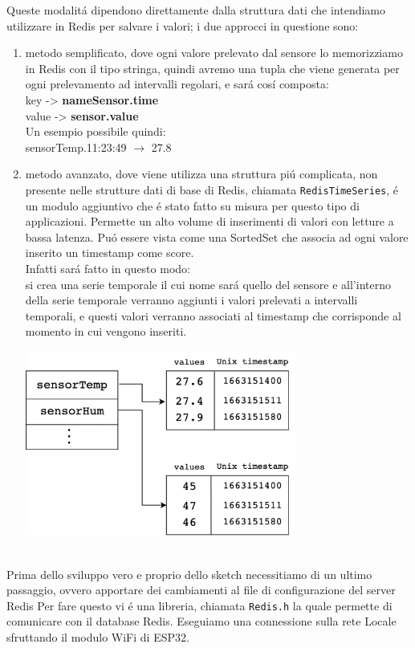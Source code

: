 Queste modalitá dipendono direttamente dalla struttura dati che intendiamo utilizzare in Redis per salvare i valori;
i due approcci in questione sono:
\begin{enumerate}
    \item metodo semplificato, dove ogni valore prelevato dal sensore lo memorizziamo in Redis con il tipo stringa,
    quindi avremo una tupla che viene generata per ogni prelevamento ad intervalli regolari, e sará cosí composta:\\
    key -> \textbf{nameSensor.time}\\
    value -> \textbf{sensor.value} \\
    Un esempio possibile quindi:\\
    sensorTemp.11:23:49 $\to$ 27.8
    \item metodo avanzato, dove viene utilizza una struttura piú complicata, non presente nelle strutture dati di base di Redis,
    chiamata \texttt{RedisTimeSeries}, é un modulo aggiuntivo che é stato fatto su misura per questo tipo di applicazioni.
    Permette un alto volume di inserimenti di valori con letture a bassa latenza. Puó essere vista come una SortedSet che associa
    ad ogni valore inserito un timestamp come score.\\
    Infatti sará fatto in questo modo:\\
    si crea una serie temporale il cui nome sará quello del sensore e all'interno della serie temporale verranno aggiunti i valori
    prelevati a intervalli temporali, e questi valori verranno associati al timestamp che corrisponde
    al momento in cui vengono inseriti.

    \includegraphics[width=0.7\textwidth]{img/redistimeseries}
\end{enumerate}

\\

Prima dello sviluppo vero e proprio dello sketch necessitiamo di un ultimo passaggio, ovvero apportare dei cambiamenti al file di configurazione del server Redis
Per fare questo vi é una libreria, chiamata \texttt{Redis.h} la quale permette di comunicare con il database Redis.
Eseguiamo una connessione sulla rete Locale sfruttando il modulo WiFi di ESP32.


